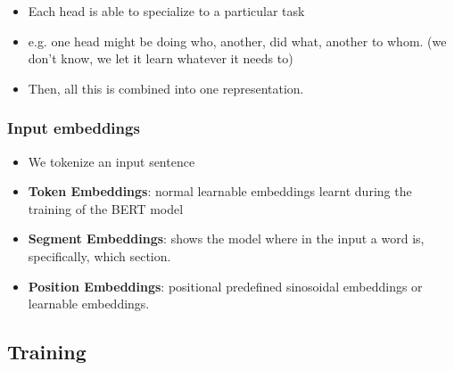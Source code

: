 \documentclass[11pt]{article}
\begin{document}
\begin{minipage}[l]{.5\linewidth}
    \begin{figure}[H]
        \centering
    \end{figure}    
\end{minipage}\hfill
\begin{minipage}[r]{.48\linewidth}
    \begin{itemize}
        \item Each head is able to specialize to a particular task
        \item e.g. one head might be doing who, another, did what, another to whom. (we don't know, we let it learn whatever it needs to)
        \item Then, all this is combined into one representation.
    \end{itemize}
\end{minipage}

\subsubsection{Input embeddings}

\begin{minipage}[l]{.5\linewidth}
    \begin{figure}[H]
        \centering
    \end{figure}    
\end{minipage}\hfill
\begin{minipage}[r]{.48\linewidth}
    \begin{itemize}
        \item We tokenize an input sentence
        \item \textbf{Token Embeddings}: normal learnable embeddings learnt during the training of the BERT model
        \item \textbf{Segment Embeddings}: shows the model where in the input a word is, specifically, which section.
        \item \textbf{Position Embeddings}: positional predefined sinosoidal embeddings or learnable embeddings.
    \end{itemize}
\end{minipage}

\subsection{Training}
\end{document}
